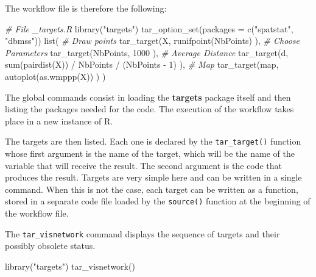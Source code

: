\documentclass[
  12pt,
  american,
  a4paper,
  extrafontsizes,onecolumn,openright
  ]{memoir}
\newenvironment{Shaded}{\begin{snugshade}}{\end{snugshade}}
\newcommand{\AttributeTok}[1]{\textcolor[rgb]{0.77,0.63,0.00}{#1}}
\newcommand{\CommentTok}[1]{\textcolor[rgb]{0.56,0.35,0.01}{\textit{#1}}}
\newcommand{\DecValTok}[1]{\textcolor[rgb]{0.00,0.00,0.81}{#1}}
\newcommand{\FunctionTok}[1]{\textcolor[rgb]{0.00,0.00,0.00}{#1}}
\newcommand{\NormalTok}[1]{#1}
\newcommand{\SpecialCharTok}[1]{\textcolor[rgb]{0.00,0.00,0.00}{#1}}
\newcommand{\StringTok}[1]{\textcolor[rgb]{0.31,0.60,0.02}{#1}}
\begin{document}
The workflow file is therefore the following:

\scriptsize

\begin{Shaded}
\begin{Highlighting}[]
\CommentTok{\# File \_targets.R }
\FunctionTok{library}\NormalTok{(}\StringTok{"targets"}\NormalTok{)}
\FunctionTok{tar\_option\_set}\NormalTok{(}\AttributeTok{packages =} \FunctionTok{c}\NormalTok{(}\StringTok{"spatstat"}\NormalTok{, }\StringTok{"dbmss"}\NormalTok{))}
\FunctionTok{list}\NormalTok{(}
  \CommentTok{\# Draw points}
  \FunctionTok{tar\_target}\NormalTok{(X,}
    \FunctionTok{runifpoint}\NormalTok{(NbPoints)}
\NormalTok{  ),}
  \CommentTok{\# Choose Parameters}
  \FunctionTok{tar\_target}\NormalTok{(NbPoints,}
    \DecValTok{1000}
\NormalTok{  ),}
  \CommentTok{\# Average Distance}
  \FunctionTok{tar\_target}\NormalTok{(d,}
    \FunctionTok{sum}\NormalTok{(}\FunctionTok{pairdist}\NormalTok{(X)) }\SpecialCharTok{/}\NormalTok{ NbPoints }\SpecialCharTok{/}\NormalTok{ (NbPoints }\SpecialCharTok{{-}} \DecValTok{1}\NormalTok{)}
\NormalTok{  ),}
  \CommentTok{\# Map}
  \FunctionTok{tar\_target}\NormalTok{(map, }
    \FunctionTok{autoplot}\NormalTok{(}\FunctionTok{as.wmppp}\NormalTok{(X))}
\NormalTok{  )}
\NormalTok{)}
\end{Highlighting}
\end{Shaded}

\normalsize

The global commands consist in loading the \textbf{targets} package itself and then listing the packages needed for the code.
The execution of the workflow takes place in a new instance of R.

The targets are then listed.
Each one is declared by the \texttt{tar\_target()} function whose first argument is the name of the target, which will be the name of the variable that will receive the result.
The second argument is the code that produces the result.
Targets are very simple here and can be written in a single command.
When this is not the case, each target can be written as a function, stored in a separate code file loaded by the \texttt{source()} function at the beginning of the workflow file.

The \texttt{tar\_visnetwork} command displays the sequence of targets and their possibly obsolete status.

\scriptsize

\begin{Shaded}
\begin{Highlighting}[]
\FunctionTok{library}\NormalTok{(}\StringTok{"targets"}\NormalTok{)}
\FunctionTok{tar\_visnetwork}\NormalTok{()}
\end{Highlighting}
\end{Shaded}
\end{document}
